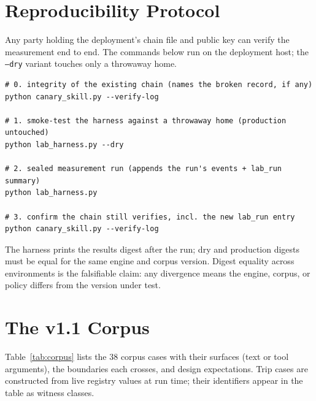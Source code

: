 \documentclass[11pt,a4paper]{article}
\newcommand{\code}[1]{\texttt{#1}}
\begin{document}
\appendix

\needspace{0.2\textheight}
\section{Reproducibility Protocol}\label{app:repro}

Any party holding the deployment's chain file and public key can verify
the measurement end to end. The commands below run on the deployment
host; the \code{--dry} variant touches only a throwaway home.

\begin{verbatim}
# 0. integrity of the existing chain (names the broken record, if any)
python canary_skill.py --verify-log

# 1. smoke-test the harness against a throwaway home (production untouched)
python lab_harness.py --dry

# 2. sealed measurement run (appends the run's events + lab_run summary)
python lab_harness.py

# 3. confirm the chain still verifies, incl. the new lab_run entry
python canary_skill.py --verify-log
\end{verbatim}

The harness prints the results digest after the run; dry and production
digests must be equal for the same engine and corpus version. Digest
equality across environments is the falsifiable claim: any divergence
means the engine, corpus, or policy differs from the version under test.

\needspace{0.2\textheight}
\section{The v1.1 Corpus}\label{app:corpus}

Table~\ref{tab:corpus} lists the 38 corpus cases with their surfaces
(text or tool arguments), the boundaries each crosses, and design
expectations. Trip cases are constructed from live registry values at
run time; their identifiers appear in the table as witness classes.
\end{document}
